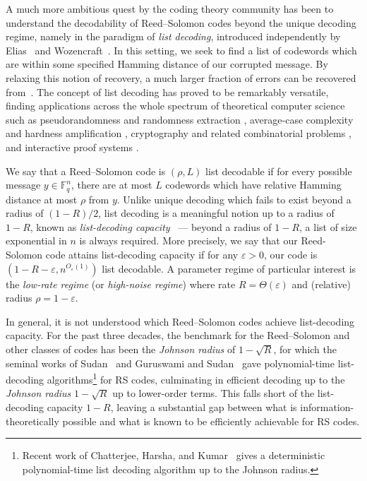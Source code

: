 \documentclass[11pt]{article}
\newcommand{\F}{\mathbb F}
\newcommand{\eps}{\varepsilon}
\begin{document}
A much more ambitious quest by the coding theory community has been to understand the decodability of Reed--Solomon codes beyond the unique decoding regime, namely in the paradigm of \emph{list decoding}, introduced independently by Elias~\cite{elias1957list} and Wozencraft~\cite{wozencraft1958list}. In this setting, we seek to find a list of codewords which are within some specified Hamming distance of our corrupted message. By relaxing this notion of recovery, a much larger fraction of errors can be recovered from~\cite{Sudan1997,GuruswamiSudan1999}. The concept of list decoding has proved to be remarkably versatile, finding applications across the whole spectrum of theoretical computer science such as pseudorandomness and randomness extraction
\cite{SudanTrevisanVadhan01,Trevisan01,GuruswamiUmansVadhan09},
average-case complexity and hardness amplification
\cite{GoldreichLevin89,GoldreichRubinfeldSudan00},
cryptography and related combinatorial problems
\cite{SilverbergStaddonWalker01,AkaviaGoldwasserSafra03,
JuelsSudan06,AlonGuruswamiKaufmanSudan07}, and interactive proof systems \cite{BenSassonCarmonIshaiKoppartySaraf23,BenSassonCarmonHaboeckKoppartySaraf26}.

We say that a Reed--Solomon code is $(\rho, L)$ list decodable if for every possible message $y \in \F_q^n$, there are at most $L$ codewords which have relative Hamming distance at most $\rho$ from $y$. Unlike unique decoding which fails to exist beyond a radius of $(1-R)/2$, list decoding is a meaningful notion up to a radius of $1-R$, known as \emph{list-decoding capacity}~\cite[Theorem~7.4.1]{guruswami2012essential} --- beyond a radius of $1-R$, a list of size exponential in $n$ is always required.  More precisely, we say that our Reed-Solomon code attains list-decoding capacity if for any $\eps > 0$, our code is $(1-R-\eps, n^{O_{\eps}(1)})$ list decodable. A parameter regime of particular interest is the \emph{low-rate regime} (or \emph{high-noise regime}) where rate $R = \Theta(\eps)$ and (relative) radius $\rho = 1-\eps$.

In general, it is not understood which Reed--Solomon codes achieve list-decoding capacity. For the past three decades, the benchmark for the Reed--Solomon and other classes of codes has been the \emph{Johnson radius} of $1-\sqrt{R}$, for which the seminal works of Sudan~\cite{Sudan1997} and Guruswami and Sudan~\cite{GuruswamiSudan1999} gave polynomial-time list-decoding algorithms\footnote{Recent work of Chatterjee, Harsha, and Kumar~\cite{ChatterjeeHarshaKumar2026} gives a deterministic polynomial-time list decoding algorithm up to the Johnson radius.} for RS codes, culminating in efficient decoding up to the \emph{Johnson radius} $1-\sqrt{R}$
up to lower-order terms. This falls short of the list-decoding capacity $1-R$, leaving a substantial gap between what is information-theoretically possible and what is known to be efficiently achievable for RS codes.
\end{document}
